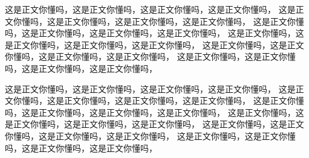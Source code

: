 \documentclass[11pt,a4paper]{article}
\begin{document}
这是正文你懂吗，这是正文你懂吗，这是正文你懂吗，这是正文你懂吗，
这是正文你懂吗，这是正文你懂吗，这是正文你懂吗，这是正文你懂吗，
这是正文你懂吗，这是正文你懂吗，这是正文你懂吗，这是正文你懂吗，
这是正文你懂吗，这是正文你懂吗，这是正文你懂吗，这是正文你懂吗，
这是正文你懂吗，这是正文你懂吗，这是正文你懂吗，这是正文你懂吗，
这是正文你懂吗，这是正文你懂吗，这是正文你懂吗，这是正文你懂吗，

这是正文你懂吗，这是正文你懂吗，这是正文你懂吗，这是正文你懂吗，
这是正文你懂吗，这是正文你懂吗，这是正文你懂吗，这是正文你懂吗，
这是正文你懂吗，这是正文你懂吗，这是正文你懂吗，这是正文你懂吗，
这是正文你懂吗，这是正文你懂吗，这是正文你懂吗，这是正文你懂吗，
这是正文你懂吗，这是正文你懂吗，这是正文你懂吗，这是正文你懂吗，
这是正文你懂吗，这是正文你懂吗，这是正文你懂吗，这是正文你懂吗，
\end{document}
